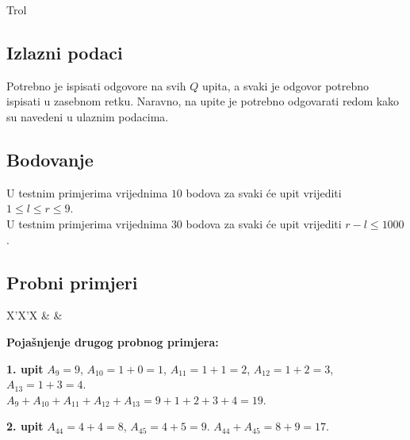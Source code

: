 \begin{statement}[
  problempoints=50,
  timelimit=1 sekunda,
  memorylimit=512 MiB,
]{Trol}
\subsection*{Izlazni podaci}
Potrebno je ispisati odgovore na svih $Q$ upita, a svaki je odgovor potrebno
ispisati u zasebnom retku. Naravno, na upite je potrebno odgovarati redom kako
su navedeni u ulaznim podacima.

\subsection*{Bodovanje}
U testnim primjerima vrijednima $10$ bodova za svaki će upit vrijediti
$1 \le l \le r \le 9$. \\
U testnim primjerima vrijednima $30$ bodova za svaki će upit vrijediti
$r - l \le 1000$.

\subsection*{Probni primjeri}
\begin{tabularx}{\textwidth}{X'X'X}
 &
 &
\end{tabularx}

\textbf{Pojašnjenje drugog probnog primjera:}

\textbf{1. upit} \textrightarrow{}
$A_9 = 9$, $A_{10} = 1 + 0 = 1$, $A_{11} = 1 + 1 = 2$,
$A_{12} = 1 + 2 = 3$, $A_{13} = 1 + 3 = 4$.\\
$A_9 + A_{10} + A_{11} + A_{12} + A_{13} = 9 + 1 + 2 + 3 + 4 = 19$.

\textbf{2. upit} \textrightarrow{}
$A_{44} = 4 + 4 = 8$, $A_{45} = 4 + 5 = 9$. $A_{44} + A_{45} = 8 + 9 = 17$.

\end{statement}

